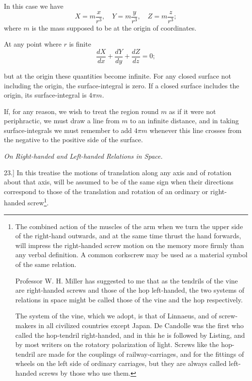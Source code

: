 \documentclass[11pt,a4paper]{article}
\begin{document}
In this case we have
\[
X=m\frac{x}{r^3},\quad Y=m\frac{y}{r^3},\quad Z=m\frac{z}{r^3};
\]
where \(m\) is the mass supposed to be at the origin of coordinates.

At any point where \(r\) is finite
\[
\frac{dX}{dx}+\frac{dY}{dy}+\frac{dZ}{dz}=0;
\]

\clearpage
\setcounter{footnote}{0}

but at the origin these quantities become infinite. For any closed
surface not including the origin, the surface-integral is zero. If a
closed surface includes the origin, its surface-integral is \(4\pi m\).

If, for any reason, we wish to treat the region round \(m\) as if it
were not periphractic, we must draw a line from \(m\) to an infinite
distance, and in taking surface-integrals we must remember to add
\(4\pi m\) whenever this line crosses from the negative to the positive
side of the surface.

\begin{center}
\textit{On Right-handed and Left-handed Relations in Space.}
\end{center}

23.] In this treatise the motions of translation along any axis and of
rotation about that axis, will be assumed to be of the same sign when
their directions correspond to those of the translation and rotation of
an ordinary or right-handed screw\footnote{The combined action of the
muscles of the arm when we turn the upper side of the right-hand
outwards, and at the same time thrust the hand forwards, will impress
the right-handed screw motion on the memory more firmly than any verbal
definition. A common corkscrew may be used as a material symbol of the
same relation.

Professor W. H. Miller has suggested to me that as the tendrils of the
vine are right-handed screws and those of the hop left-handed, the two
systems of relations in space might be called those of the vine and the
hop respectively.

The system of the vine, which we adopt, is that of Linnaeus, and of
screw-makers in all civilized countries except Japan. De Candolle was
the first who called the hop-tendril right-handed, and in this he is
followed by Listing, and by most writers on the rotatory polarization of
light. Screws like the hop-tendril are made for the couplings of
railway-carriages, and for the fittings of wheels on the left side of
ordinary carriages, but they are always called left-handed screws by
those who use them.}.
\end{document}
